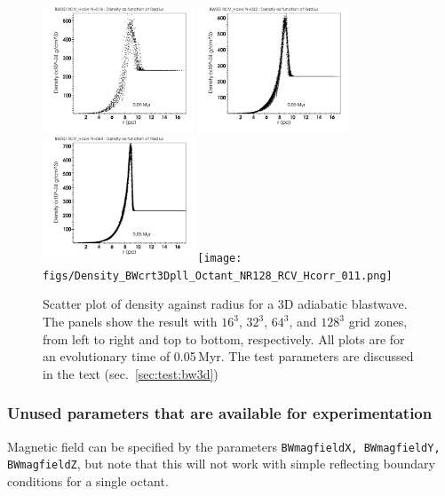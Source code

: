 \documentclass[a4paper,11pt]{report}
\begin{document}
\begin{figure}
\centering
\includegraphics[width=0.4\textwidth]{figs/Density_BWcrt3Dpll_Octant_NR016_RCV_Hcorr_011.png}
\includegraphics[width=0.4\textwidth]{figs/Density_BWcrt3Dpll_Octant_NR032_RCV_Hcorr_011.png}
\includegraphics[width=0.4\textwidth]{figs/Density_BWcrt3Dpll_Octant_NR064_RCV_Hcorr_011.png}
\texttt{[image: figs/Density\_BWcrt3Dpll\_Octant\_NR128\_RCV\_Hcorr\_011.png]}
\caption{
  Scatter plot of density against radius for a 3D adiabatic blastwave.
  The panels show the result with $16^3$, $32^3$, $64^3$, and $128^3$ grid zones, from left to right and top to bottom, respectively.
  All plots are for an evolutionary time of 0.05\,Myr.
  The test parameters are discussed in the text (sec.~\ref{sec:test:bw3d})
    }
\label{fig:bw3d_hd_adi_n032}
\end{figure}

\subsubsection{Unused parameters that are available for experimentation}
Magnetic field can be specified by the parameters \lstinline|BWmagfieldX, BWmagfieldY, BWmagfieldZ|, but note that this will not work with simple reflecting boundary conditions for a single octant.
\end{document}

